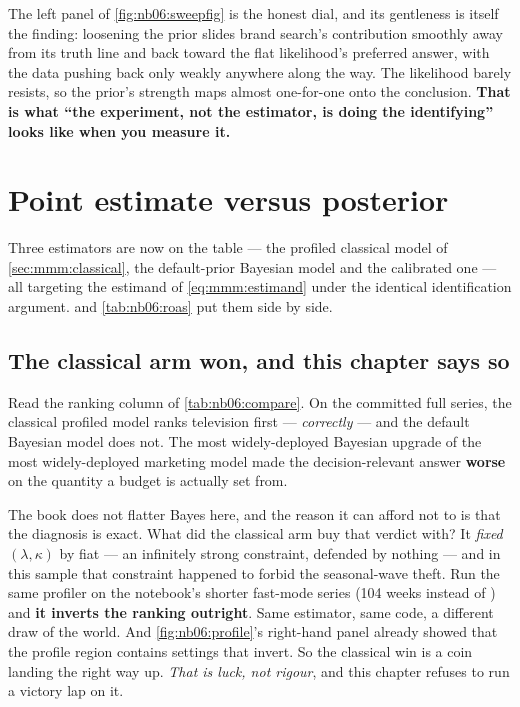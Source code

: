 The left panel of \cref{fig:nb06:sweepfig} is the honest dial, and its gentleness is itself the
finding: loosening the prior slides brand search's contribution smoothly away from its truth line
and back toward the flat likelihood's preferred answer, with the data pushing back only weakly
anywhere along the way. The likelihood barely resists, so the prior's strength maps almost
one-for-one onto the conclusion. \textbf{That is what ``the experiment, not the estimator, is doing
the identifying'' looks like when you measure it.}

\section{Point estimate versus posterior}
\label{sec:mmm:compare}

Three estimators are now on the table --- the profiled classical model of
\cref{sec:mmm:classical}, the default-prior Bayesian model and the calibrated one --- all targeting
the estimand of \cref{eq:mmm:estimand} under the identical identification argument.
 and \cref{tab:nb06:roas} put them side by side.



\subsection*{The classical arm won, and this chapter says so}

Read the ranking column of \cref{tab:nb06:compare}. On the committed full series, the classical
profiled model ranks television first --- \emph{correctly} --- and the default Bayesian model does
not. The most widely-deployed Bayesian upgrade of the most widely-deployed marketing model made
the decision-relevant answer \textbf{worse} on the quantity a budget is actually set from.

The book does not flatter Bayes here, and the reason it can afford not to is that the diagnosis is
exact. What did the classical arm buy that verdict with? It \emph{fixed} $(\lambda, \kappa)$ by
fiat --- an infinitely strong constraint, defended by nothing --- and in this sample that
constraint happened to forbid the seasonal-wave theft. Run the same profiler on the notebook's
shorter fast-mode series (104 weeks instead of \nbSixNWeeks{}) and \textbf{it inverts the ranking
outright}. Same estimator, same code, a different draw of the world. And
\cref{fig:nb06:profile}'s right-hand panel already showed that the profile region contains settings
that invert. So the classical win is a coin landing the right way up. \emph{That is luck, not
rigour}, and this chapter refuses to run a victory lap on it.

